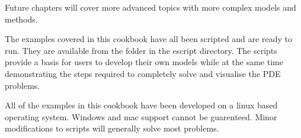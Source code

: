 Future chapters will cover more advanced topics with more complex models and methods.

The examples covered in this cookbook have all been scripted and are ready to run. They are available from the \exf folder in the escript directory. The scripts provide a basis for users to develop their own models while at the same time demonstrating the steps required to completely solve and visualise the PDE problems.

All of the examples in this cookbook have been developed on a linux based operating system. Windows and mac support cannot be guarenteed. Minor modifications to scripts will generally solve most problems.



